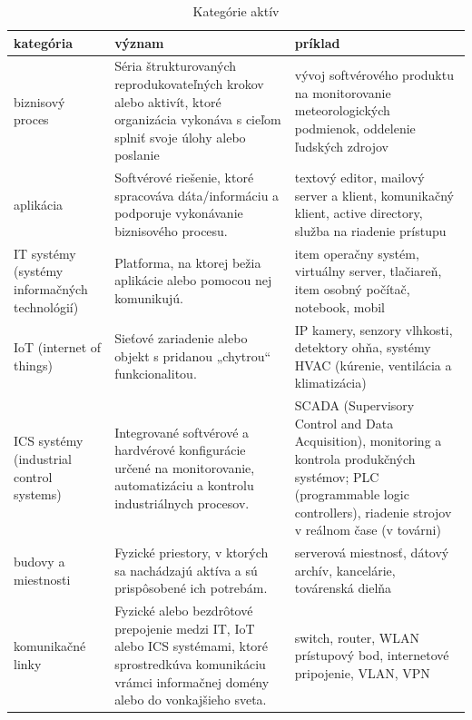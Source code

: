 \begin{table}[h!]
    \caption{Kategórie aktív}
    \label{tab:assetcategory}
    \begin{center}
        \footnotesize
        \begin{tabular}{ |p{}|p{}|p{}| }
            \hline
            kategória & význam & príklad \\
            \hline
            \hline
            biznisový proces
                      &
            Séria štrukturovaných reprodukovateľných krokov alebo aktivít, ktoré organizácia vykonáva s cieľom splniť svoje úlohy alebo poslanie
                      &
            vývoj softvérového produktu na monitorovanie meteorologických podmienok, oddelenie ľudských zdrojov
            \\
            \hline
            aplikácia
                      &
            Softvérové riešenie, ktoré spracováva dáta/informáciu a podporuje vykonávanie biznisového procesu.
                      &
            textový editor, mailový server a klient, komunikačný klient, active directory, služba na riadenie prístupu
            \\
            \hline
            IT systémy (systémy informačných technológií)
                      &
            Platforma, na ktorej bežia aplikácie alebo pomocou nej komunikujú.
                      &
            item operačny systém, virtuálny server, tlačiareň, item osobný počítač, notebook, mobil
            \\
            \hline
            IoT (internet of things)
                      &
            Sieťové zariadenie alebo objekt s pridanou „chytrou“ funkcionalitou.
                      &
            IP kamery, senzory vlhkosti, detektory ohňa, systémy HVAC (kúrenie, ventilácia a klimatizácia)
            \\
            \hline
            ICS systémy (industrial control systems)
                      &
            Integrované softvérové a hardvérové konfigurácie určené na monitorovanie, automatizáciu a kontrolu industriálnych procesov.
                      &
            SCADA (Supervisory Control and Data Acquisition), monitoring a kontrola produkčných systémov; PLC (programmable logic controllers), riadenie strojov v reálnom čase (v továrni)
            \\
            \hline
            budovy a miestnosti
                      &
            Fyzické priestory, v ktorých sa nachádzajú aktíva a sú prispôsobené ich potrebám.
                      &
            serverová miestnosť, dátový archív, kancelárie, továrenská dielňa
            \\
            \hline
            komunikačné linky
                      &
            Fyzické alebo bezdrôtové prepojenie medzi IT, IoT alebo ICS systémami, ktoré sprostredkúva komunikáciu vrámci informačnej domény alebo do vonkajšieho sveta.
                      &
            switch, router, WLAN prístupový bod, internetové pripojenie, VLAN, VPN
    

\end{tabular}
\end{center}
\end{table}
